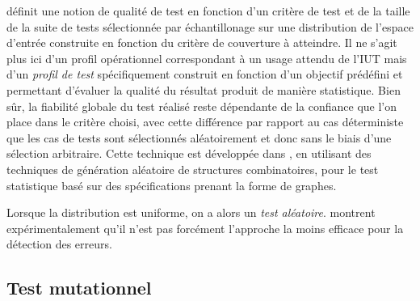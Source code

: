 \cite{thevenod-stat-test} d\'efinit une notion de qualit\'e de
test en fonction d'un crit\`ere de test et de la taille de la suite
de tests s\'electionn\'ee par \'echantillonage sur une distribution
de l'espace d'entr\'ee construite en fonction du crit\`ere de
couverture \`a atteindre. Il ne s'agit plus ici d'un
profil op\'erationnel correspondant \`a un usage attendu de l'IUT
mais d'un \emph{profil de test} sp\'ecifiquement construit en
fonction d'un objectif pr\'ed\'efini et permettant d'\'evaluer la
qualit\'e du r\'esultat produit de mani\`ere statistique. Bien
s\^ur, la fiabilit\'e globale du test r\'ealis\'e reste
d\'ependante de la confiance que l'on place dans le crit\`ere choisi,
avec cette diff\'erence par rapport au cas d\'eterministe que les
cas de tests sont s\'electionn\'es al\'eatoirement et donc sans
le biais  d'une s\'election arbitraire. Cette technique est
d\'evelopp\'ee dans \cite{gouraud-issre04}, en utilisant des
techniques de g\'en\'eration al\'eatoire de structures
combinatoires, pour le test statistique bas\'e sur des
sp\'ecifications prenant la forme de graphes.

Lorsque la distribution est uniforme, on a alors un \emph{test
  al\'eatoire}. \cite{thevenod-structtest,ntafos-comparison} montrent
exp\'erimentalement qu'il n'est pas forc\'ement l'approche la moins efficace pour la
d\'etection des erreurs.

\subsection{Test mutationnel}

